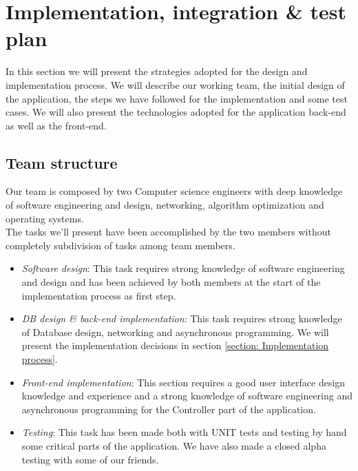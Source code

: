 \documentclass[paper=a4, fontsize=12pt]{scrartcl}
\numberwithin{equation}{section}		%
\numberwithin{figure}{section}			%
\numberwithin{table}{section}				%
\begin{document}
\clearpage
\section{Implementation, integration \& test plan}
In this section we will present the strategies adopted for the design and implementation process. We will describe our working team, the initial design of the application, the steps we have followed for the implementation and some test cases. We will also present the technologies adopted for the application back-end as well as the front-end.

\subsection{Team structure}
Our team is composed by two Computer science engineers with deep knowledge of software engineering and design, networking, algorithm optimization and operating systems.\\
The tasks we'll present have been accomplished by the two members without completely subdivision of tasks among team members.
\begin{itemize}
    \item \textit{Software design}: This task requires strong knowledge of software engineering and design and has been achieved by both members at the start of the implementation process as first step.
    \item \textit{DB design \& back-end implementation}: This task requires strong knowledge of Database design, networking and asynchronous programming. We will present the implementation decisions in section \ref{section: Implementation process}.
    \item \textit{Front-end implementation}: This section requires a good user interface design knowledge and experience and a strong knowledge of software engineering and asynchronous programming for the Controller part of the application.
    \item \textit{Testing}: This task has been made both with UNIT tests and testing by hand some critical parts of the application. We have also made a closed alpha testing with some of our friends.
\end{itemize}
\end{document}
